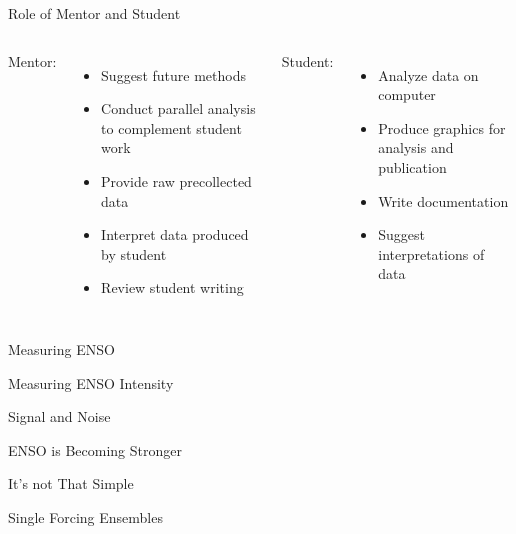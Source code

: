 \documentclass{beamer}
\begin{document}
\begin{frame}{Role of Mentor and Student}
  \begin{columns}[t]
    Mentor:
    \begin{itemize}
    \item Suggest future methods
    \item Conduct parallel analysis to complement student work
    \item Provide raw precollected data
    \item Interpret data produced by student
    \item Review student writing
    \end{itemize}
    Student:
    \begin{itemize}
    \item Analyze data on computer
    \item Produce graphics for analysis and publication
    \item Write documentation
    \item Suggest interpretations of data
    \end{itemize}
  \end{columns}

\end{frame}

\begin{frame}{Measuring ENSO}

\end{frame}

\begin{frame}{Measuring ENSO Intensity}

\end{frame}

\begin{frame}{Signal and Noise}

\end{frame}

\begin{frame}{ENSO is Becoming Stronger}

\end{frame}

\begin{frame}{It's not That Simple}

\end{frame}

\begin{frame}{Single Forcing Ensembles}

\end{frame}
\end{document}
